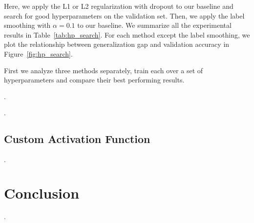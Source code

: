 \documentclass{article}
\begin{document}
Here, we apply the L1 or L2 regularization with dropout to our baseline and search for good hyperparameters on the validation set. 
Then, we apply the label smoothing with $\alpha=0.1$ to our baseline.
We summarize all the experimental results in Table~\ref{tab:hp_search}. For each method except the label smoothing, we plot the relationship between generalization gap and validation accuracy in Figure~\ref{fig:hp_search}.

First we analyze three methods separately, train each over a set of hyperparameters and compare their best performing results.

\questionSeven.

\questionEight.

\subsection{Custom Activation Function}

\questionNine.

\section{Conclusion}
\label{sec:concl}
    
\questionTen.

\appendixMixupCutMix

\newpage

\end{document}
